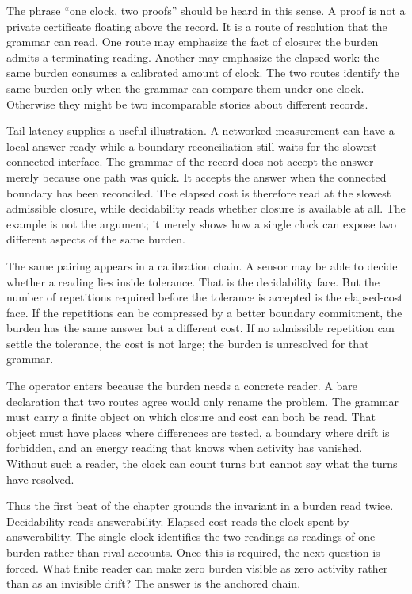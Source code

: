 The phrase ``one clock, two proofs'' should be heard in this sense. A proof
is not a private certificate floating above the record. It is a route of
resolution that the grammar can read. One route may emphasize the fact of
closure: the burden admits a terminating reading. Another may emphasize the
elapsed work: the same burden consumes a calibrated amount of clock. The two
routes identify the same burden only when the grammar can compare them under
one clock. Otherwise they might be two incomparable stories about different
records.

Tail latency supplies a useful illustration. A networked measurement can
have a local answer ready while a boundary reconciliation still waits for
the slowest connected interface. The grammar of the record does not accept
the answer merely because one path was quick. It accepts the answer when the
connected boundary has been reconciled. The elapsed cost is therefore read
at the slowest admissible closure, while decidability reads whether closure
is available at all. The example is not the argument; it merely shows how a
single clock can expose two different aspects of the same burden.

The same pairing appears in a calibration chain. A sensor may be able to
decide whether a reading lies inside tolerance. That is the decidability
face. But the number of repetitions required before the tolerance is
accepted is the elapsed-cost face. If the repetitions can be compressed by a
better boundary commitment, the burden has the same answer but a different
cost. If no admissible repetition can settle the tolerance, the cost is not
large; the burden is unresolved for that grammar.

The operator enters because the burden needs a concrete reader. A bare
declaration that two routes agree would only rename the problem. The grammar
must carry a finite object on which closure and cost can both be read. That
object must have places where differences are tested, a boundary where drift
is forbidden, and an energy reading that knows when activity has vanished.
Without such a reader, the clock can count turns but cannot say what the
turns have resolved.

Thus the first beat of the chapter grounds the invariant in a burden read
twice. Decidability reads answerability. Elapsed cost reads the clock spent
by answerability. The single clock identifies the two readings as readings
of one burden rather than rival accounts. Once this is required, the next
question is forced. What finite reader can make zero burden visible as zero
activity rather than as an invisible drift? The answer is the anchored
chain.

